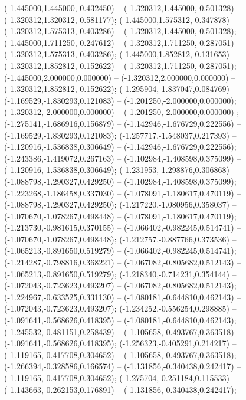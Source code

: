  (-1.445000,1.445000,-0.432450) -- (-1.320312,1.445000,-0.501328) -- (-1.320312,1.320312,-0.581177);
 (-1.445000,1.575312,-0.347878) -- (-1.320312,1.575313,-0.403286) -- (-1.320312,1.445000,-0.501328);
 (-1.445000,1.711250,-0.247612) -- (-1.320312,1.711250,-0.287051) -- (-1.320312,1.575313,-0.403286);
 (-1.445000,1.852812,-0.131653) -- (-1.320312,1.852812,-0.152622) -- (-1.320312,1.711250,-0.287051);
 (-1.445000,2.000000,0.000000) -- (-1.320312,2.000000,0.000000) -- (-1.320312,1.852812,-0.152622);
 (-1.295904,-1.837047,0.084769) -- (-1.169529,-1.830293,0.121083) -- (-1.201250,-2.000000,0.000000);
 (-1.320312,-2.000000,0.000000) -- (-1.201250,-2.000000,0.000000) ;
 (-1.275141,-1.686916,0.156879) -- (-1.142946,-1.676729,0.222556) -- (-1.169529,-1.830293,0.121083);
 (-1.257717,-1.548037,0.217393) -- (-1.120916,-1.536838,0.306649) -- (-1.142946,-1.676729,0.222556);
 (-1.243386,-1.419072,0.267163) -- (-1.102984,-1.408598,0.375099) -- (-1.120916,-1.536838,0.306649);
 (-1.231953,-1.298876,0.306868) -- (-1.088798,-1.290327,0.429250) -- (-1.102984,-1.408598,0.375099);
 (-1.223268,-1.186458,0.337030) -- (-1.078091,-1.180617,0.470119) -- (-1.088798,-1.290327,0.429250);
 (-1.217220,-1.080956,0.358037) -- (-1.070670,-1.078267,0.498448) -- (-1.078091,-1.180617,0.470119);
 (-1.213730,-0.981615,0.370155) -- (-1.066402,-0.982245,0.514741) -- (-1.070670,-1.078267,0.498448);
 (-1.212757,-0.887766,0.373536) -- (-1.065213,-0.891650,0.519279) -- (-1.066402,-0.982245,0.514741);
 (-1.214287,-0.798816,0.368221) -- (-1.067082,-0.805682,0.512143) -- (-1.065213,-0.891650,0.519279);
 (-1.218340,-0.714231,0.354144) -- (-1.072043,-0.723623,0.493207) -- (-1.067082,-0.805682,0.512143);
 (-1.224967,-0.633525,0.331130) -- (-1.080181,-0.644810,0.462143) -- (-1.072043,-0.723623,0.493207);
 (-1.234252,-0.556254,0.298885) -- (-1.091641,-0.568626,0.418395) -- (-1.080181,-0.644810,0.462143);
 (-1.245532,-0.481151,0.258439) -- (-1.105658,-0.493767,0.363518) -- (-1.091641,-0.568626,0.418395);
 (-1.256323,-0.405291,0.214217) -- (-1.119165,-0.417708,0.304652) -- (-1.105658,-0.493767,0.363518);
 (-1.266394,-0.328586,0.166574) -- (-1.131856,-0.340438,0.242417) -- (-1.119165,-0.417708,0.304652);
 (-1.275704,-0.251184,0.115533) -- (-1.143663,-0.262153,0.176891) -- (-1.131856,-0.340438,0.242417);
